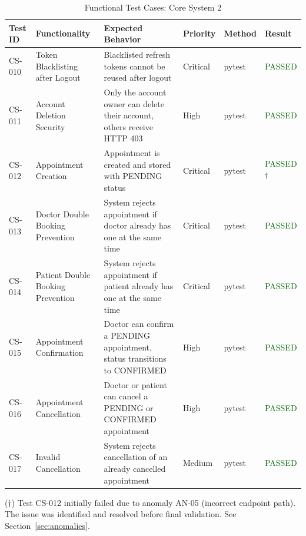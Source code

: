\begin{table}[H]
\centering
\caption{Functional Test Cases: Core System 2}
\renewcommand{\arraystretch}{1.4}
\begin{tabular}{|p{1.6cm}|p{3cm}|p{3.8cm}|p{1.6cm}|p{1.6cm}|p{1.7cm}|}
\hline
\rowcolor{green!10}
\textbf{Test ID} & \textbf{Functionality} & \textbf{Expected Behavior} & \textbf{Priority} & \textbf{Method} & \textbf{Result} \\
\hline
CS-010 & Token Blacklisting after Logout & Blacklisted refresh tokens cannot be reused after logout & Critical & pytest & \textcolor{darkgreen}{PASSED} \\
\hline
CS-011 & Account Deletion Security & Only the account owner can delete their account, others receive HTTP 403 & High & pytest & \textcolor{darkgreen}{PASSED} \\
\hline
CS-012 & Appointment Creation & Appointment is created and stored with PENDING status & Critical & pytest & \textcolor{darkgreen}{PASSED}\textsuperscript{$\dagger$} \\
\hline
CS-013 & Doctor Double Booking Prevention & System rejects appointment if doctor already has one at the same time & Critical & pytest & \textcolor{darkgreen}{PASSED} \\
\hline
CS-014 & Patient Double Booking Prevention & System rejects appointment if patient already has one at the same time & Critical & pytest & \textcolor{darkgreen}{PASSED} \\
\hline
CS-015 & Appointment Confirmation & Doctor can confirm a PENDING appointment, status transitions to CONFIRMED & High & pytest & \textcolor{darkgreen}{PASSED} \\
\hline
CS-016 & Appointment Cancellation & Doctor or patient can cancel a PENDING or CONFIRMED appointment & High & pytest & \textcolor{darkgreen}{PASSED} \\
\hline
CS-017 & Invalid Cancellation & System rejects cancellation of an already cancelled appointment & Medium & pytest & \textcolor{darkgreen}{PASSED} \\
\hline
\end{tabular}
\end{table}

($\dagger$) Test CS-012 initially failed due to anomaly AN-05 (incorrect endpoint path). The issue was identified and resolved before final validation. See Section~\ref{sec:anomalies}.

\normalsize

